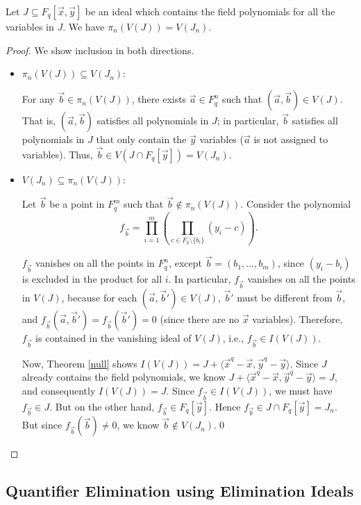 \documentclass[envcountsect]{llncs}
\begin{document}
\begin{theorem}\label{key-lemma}
Let $J\subseteq F_q[\vec x, \vec y]$ be an ideal which contains the field polynomials for all the variables in $J$. We have $\pi_n(V(J)) = V(J_n).$
\end{theorem}
\begin{proof} We show inclusion in both directions.
\begin{itemize}
\item $\pi_n(V(J)) \subseteq V(J_n):$ 

For any $\vec b\in \pi_n(V(J))$, there exists $\vec a\in F_q^n$ such that $(\vec a, \vec b)\in V(J)$. That is, $(\vec a, \vec b)$ satisfies all polynomials in $J$; in particular, $\vec b$ satisfies all polynomials in $J$ that only contain the $\vec y$ variables ($\vec a$ is not assigned to variables). Thus, $\vec b \in V(J\cap F_q[\vec y]) = V(J_n).$

\item $V(J_n)\subseteq \pi_n(V(J)):$ 

Let $\vec b$ be a point in $F_q^m$ such that $\vec b\not\in \pi_n(V(J))$. Consider the polynomial $$f_{\vec b} = \prod_{i=1}^{m} (\prod_{c\in F_q\setminus\{b_i\}} (y_i - c)).$$

$f_{\vec b}$ vanishes on all the points in $F_q^n$, except $\vec b = ( b_1,...,b_m)$, since $(y_i-b_i)$ is excluded in the product for all $i$. In particular, $f_{\vec b}$ vanishes on all the points in $V(J)$, because for each $(\vec a, \vec b')\in V(J)$, $\vec b'$ must be different from $\vec b$, and $f_{\vec b}(\vec a, \vec b') = f_{\vec b}(\vec b') = 0$ (since there are no $\vec x$ variables). Therefore, $f_{\vec b}$ is contained in the vanishing ideal of $V(J)$, i.e., $f_{\vec b}\in I(V(J))$.

Now, Theorem \ref{null} shows $I(V(J))= J+\langle \vec x^q-\vec x, \vec y^q-\vec y\rangle$.
Since $J$ already contains the field polynomials, we know $J+\langle \vec x^q-\vec x, \vec y^q-\vec y\rangle = J$, and consequently $I(V(J))= J.$ Since $f_{\vec b}\in I(V(J))$, we must have $f_{\vec b}\in J$. But on the other hand, $f_{\vec b}\in F_q[\vec y]$. Hence $f_{\vec b}\in J\cap F_q[\vec y] = J_n$. But since $f_{\vec b}(\vec b)\neq 0$,  we know $\vec b\not\in V(J_n)$.\qed
\end{itemize}
\end{proof}

\subsection{Quantifier Elimination using Elimination Ideals}
\end{document}
